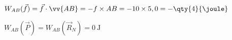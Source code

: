 \begin{enumerate}
\begin{itemize}
                $W_{AB}(\vec{f})=\vec{f}\cdot\vv{AB}=-f\times AB=
                -10\times5,0=-\qty{4}{\joule}$

                $W_{AB}(\vec{P})=W_{AB}(\vec{R}_{N})=\qty{0}{\joule}$
          \end{itemize}
\end{enumerate}





